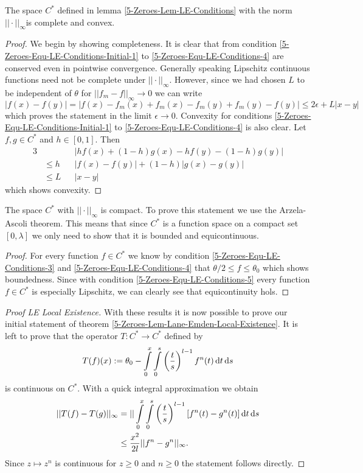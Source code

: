 \begin{lemma}
	The space $C^*$ defined in lemma \ref{5-Zeroes-Lem-LE-Conditions} with the norm $||\cdot||_\infty$is complete and convex.
\end{lemma}
\begin{proof}
	We begin by showing completeness.
	It is clear that from condition \eqref{5-Zeroes-Equ-LE-Conditions-Initial-1} to \eqref{5-Zeroes-Equ-LE-Conditions-4} are conserved even in pointwise convergence.
	Generally speaking Lipschitz continuous functions need not be complete under $||\cdot||_\infty$.
	However, since we had chosen $L$ to be independent of $\theta$ for $||f_m-f||_\infty\rightarrow0$ we can write
	\[
		|f(x)-f(y)|=|f(x)-f_m(x)+f_m(x)-f_m(y)+f_m(y)-f(y)|\leq 2\epsilon+L|x-y|
	\]
	which proves the statement in the limit $\epsilon\rightarrow0$.
	Convexity for conditions \eqref{5-Zeroes-Equ-LE-Conditions-Initial-1} to \eqref{5-Zeroes-Equ-LE-Conditions-4} is also clear.
	Let $f,g\in C^*$ and $h\in[0,1]$.
	Then
	\begin{alignat}{3}
		&&&|hf(x)+(1-h)g(x)-hf(y)-(1-h)g(y)|\\
		&\leq h&&|f(x)-f(y)|+ (1-h)|g(x)-g(y)|\\
		&\leq L&&|x-y|
	\end{alignat}
	which shows convexity.
\end{proof}\noindent
\begin{lemma}
	The space $C^*$ with $||\cdot||_\infty$ is compact.
	To prove this statement we use the Arzela-Ascoli theorem.
	This means that since $C^*$ is a function space on a compact set $[0,\lambda]$ we only need to show that it is bounded and equicontinuous.
\end{lemma}
\begin{proof}
	For every function $f\in C^*$ we know by condition \eqref{5-Zeroes-Equ-LE-Conditions-3} and \eqref{5-Zeroes-Equ-LE-Conditions-4} that $\theta/2\leq f\leq\theta_0$ which shows boundedness.
	Since with condition \eqref{5-Zeroes-Equ-LE-Conditions-5} every function $f\in C^*$ is especially Lipschitz, we can clearly see that equicontinuity hols.
\end{proof}
\begin{proof}[Proof LE Local Existence]
	With these results it is now possible to prove our initial statement of theorem \ref{5-Zeroes-Lem-Lane-Emden-Local-Existence}.
	It is left to prove that the operator $T:C^*\rightarrow C^*$ defined by
	\begin{equation}
		T(f)(x) := \theta_0 - \int\limits_0^x\int\limits_0^s \left(\frac{t}{s}\right)^{l-1}f^n(t)\mathop{}\!\mathrm{d} t\mathop{}\!\mathrm{d} s
		\label{5-Zeroes-Equ-LE-Definition-Operator-On-C-Star}
	\end{equation}
	is continuous on $C^*$.
	With a quick integral approximation we obtain
	\begin{align}
		||T(f)-T(g)||_{\infty} &= ||\int\limits_0^x\int\limits_0^s \left(\frac{t}{s}\right)^{l-1}\left[f^n(t)-g^n(t)\right]\mathop{}\!\mathrm{d} t\mathop{}\!\mathrm{d} s\\
		&\leq \frac{x^2}{2l}||f^n-g^n||_{\infty}.
	\end{align}
	Since $z\mapsto z^n$ is continuous for $z\geq0$ and $n\geq0$ the statement follows directly.
\end{proof}
